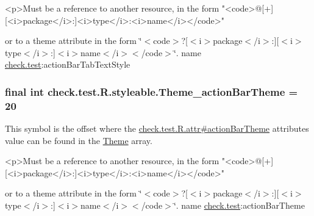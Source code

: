 \begin{DoxyVerb}      <p>Must be a reference to another resource, in the form "<code>@[+][<i>package</i>:]<i>type</i>:<i>name</i></code>"
\end{DoxyVerb}
 or to a theme attribute in the form \char`\"{}$<$code$>$?\mbox{[}$<$i$>$package$<$/i$>$\+:\mbox{]}\mbox{[}$<$i$>$type$<$/i$>$\+:\mbox{]}$<$i$>$name$<$/i$>$$<$/code$>$\char`\"{}.  name \hyperlink{namespacecheck_1_1test}{check.\+test}\+:action\+Bar\+Tab\+Text\+Style \hypertarget{classcheck_1_1test_1_1_r_1_1styleable_a0c926c0b572d1a456f5181c48e9b6eef}{}
\subsubsection[{Theme\+\_\+action\+Bar\+Theme}]{\setlength{\rightskip}{0pt plus 5cm}final int check.\+test.\+R.\+styleable.\+Theme\+\_\+action\+Bar\+Theme = 20\hspace{0.3cm}{\ttfamily [static]}}\label{classcheck_1_1test_1_1_r_1_1styleable_a0c926c0b572d1a456f5181c48e9b6eef}
This symbol is the offset where the \hyperlink{classcheck_1_1test_1_1_r_1_1attr_ae4102aa166097ebb0e9d11c82b2ad401}{check.\+test.\+R.\+attr\#action\+Bar\+Theme} attribute\textquotesingle{}s value can be found in the \hyperlink{classcheck_1_1test_1_1_r_1_1styleable_acca726d02016a0cf607782ec3a436a81}{Theme} array.

\begin{DoxyVerb}      <p>Must be a reference to another resource, in the form "<code>@[+][<i>package</i>:]<i>type</i>:<i>name</i></code>"
\end{DoxyVerb}
 or to a theme attribute in the form \char`\"{}$<$code$>$?\mbox{[}$<$i$>$package$<$/i$>$\+:\mbox{]}\mbox{[}$<$i$>$type$<$/i$>$\+:\mbox{]}$<$i$>$name$<$/i$>$$<$/code$>$\char`\"{}.  name \hyperlink{namespacecheck_1_1test}{check.\+test}\+:action\+Bar\+Theme \hypertarget{classcheck_1_1test_1_1_r_1_1styleable_a11aebf359000ff5df5b3cb3760b461ca}{}

